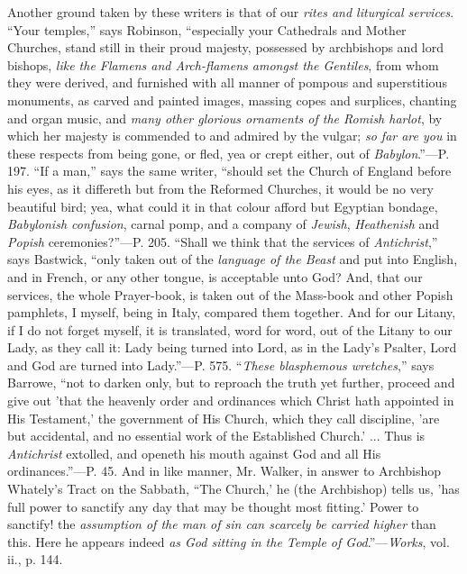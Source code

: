 Another ground taken by these writers is that of our \emph{rites and
liturgical services}. ``Your temples,'' says Robinson,
``especially your Cathedrals and Mother Churches, stand
still in their proud majesty, possessed by archbishops and lord
bishops, \emph{like the Flamens and Arch-flamens amongst the Gentiles},
from whom they were derived, and furnished with all manner of pompous
and superstitious monuments, as carved and painted images, massing
copes and surplices, chanting and organ music, and \emph{many other
glorious ornaments of the Romish harlot}, by which her majesty is
commended to and admired by the vulgar; \emph{so far are you} in these
respects from being gone, or fled, yea or crept either, out of \emph{Babylon}.''—P.
197. ``If a man,'' says the same writer, ``should set the
Church of England before his eyes, as it differeth but from the
Reformed Churches, it would be no very beautiful bird; yea, what could
it in that colour afford but Egyptian bondage, \emph{Babylonish confusion},
carnal pomp, and a company of \emph{Jewish}, \emph{Heathenish} and \emph{Popish}
ceremonies?''—P. 205. ``Shall we think that the services of \emph{Antichrist},''
says Bastwick, ``only taken out of the \emph{language of the Beast}
and put into English, and in French, or any other tongue, is
acceptable unto God? And, that our services, the whole Prayer-book, is
taken out of the Mass-book and other Popish pamphlets, I myself, being
in Italy, compared them together. And for our Litany, if I do not
forget myself, it is translated, word for word, out of the Litany to
our Lady, as they call it: Lady being turned into Lord, as in the Lady's
Psalter, Lord and God are turned into Lady.''—P. 575. ``\emph{These
blasphemous wretches},'' says Barrowe, ``not to darken
only, but to reproach the truth yet further, proceed and give out
'that the heavenly order and ordinances which Christ hath appointed in
His Testament,' the government of His Church, which they call
discipline, 'are but accidental, and no essential work of the
Established Church.' ... Thus is \emph{Antichrist} extolled, and
openeth his mouth against God and all His ordinances.''—P. 45.
And in like manner, Mr. Walker, in answer to Archbishop Whately's
Tract on the Sabbath, ``The Church,' he (the Archbishop) tells us,
'has full power to sanctify any day that may be thought most fitting.'
Power to sanctify! the \emph{assumption of the man of sin can scarcely be
carried higher} than this. Here he appears indeed \emph{as God sitting
in the Temple of God}.''—\emph{Works}, vol. ii., p. 144.

